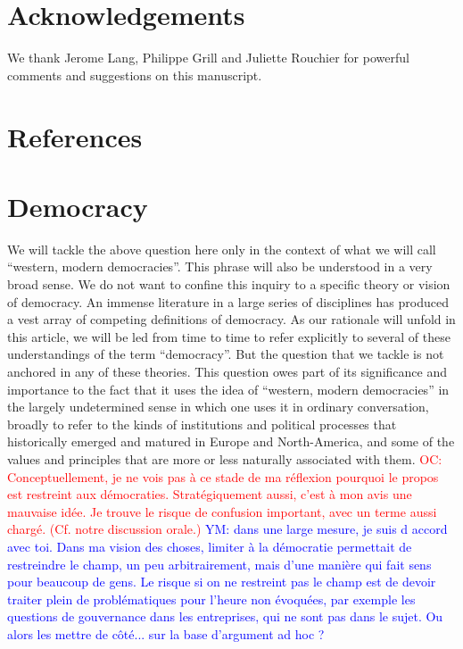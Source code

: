 \documentclass[preprint, french, english, 11pt, authoryear]{elsarticle}%
\newcommand{\commentYM}[1]{\textcolor{blue}{YM: #1}}
\newcommand{\commentOC}[1]{\textcolor{red}{OC: #1}}
\begin{document}
\section*{Acknowledgements}
We thank Jerome Lang, Philippe Grill and Juliette Rouchier for powerful comments and suggestions on this manuscript.

\section*{References}



\appendix

\section{Democracy}
We will tackle the above question here only in the context of what we will call ``western, modern democracies''. This phrase will also be understood in a very broad sense. We do not want to confine this inquiry to a specific theory or vision of democracy. An immense literature in a large series of disciplines has produced a vest array of competing definitions of democracy. As our rationale will unfold in this article, we will be led from time to time to refer explicitly to several of these understandings of the term ``democracy''. But the question that we tackle is not anchored in any of these theories. This question owes part of its significance and importance to the fact that it uses the idea of “western, modern democracies” in the largely undetermined sense in which one uses it in ordinary conversation, broadly to refer to the kinds of institutions and political processes that historically emerged and matured in Europe and North-America, and some of the values and principles that are more or less naturally associated with them.
\commentOC{Conceptuellement, je ne vois pas à ce stade de ma réflexion pourquoi le propos est restreint aux démocraties. Stratégiquement aussi, c’est à mon avis une mauvaise idée. Je trouve le risque de confusion important, avec un terme aussi chargé. (Cf. notre discussion orale.)}
\commentYM{dans une large mesure, je suis d accord avec toi. Dans ma vision des choses, limiter à la démocratie permettait de restreindre le champ, un peu arbitrairement, mais d'une manière qui fait sens pour beaucoup de gens. Le risque si on ne restreint pas le champ est de devoir traiter plein de problématiques pour l'heure non évoquées, par exemple les questions de gouvernance dans les entreprises, qui ne sont pas dans le sujet. Ou alors les mettre de côté... sur la base d'argument ad hoc ?}
\end{document}
